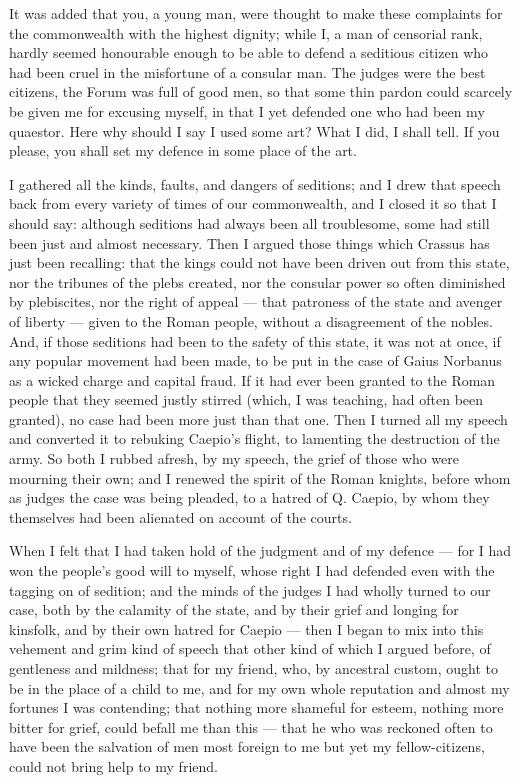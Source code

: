  It was added that you, a young man, were thought to make these complaints for the commonwealth with the highest dignity; while I, a man of censorial rank, hardly seemed honourable enough to be able to defend a seditious citizen who had been cruel in the misfortune of a consular man. The judges were the best citizens, the Forum was full of good men, so that some thin pardon could scarcely be given me for excusing myself, in that I yet defended one who had been my quaestor. Here why should I say I used some art? What I did, I shall tell. If you please, you shall set my defence in some place of the art.

 I gathered all the kinds, faults, and dangers of seditions; and I drew that speech back from every variety of times of our commonwealth, and I closed it so that I should say: although seditions had always been all troublesome, some had still been just and almost necessary. Then I argued those things which Crassus has just been recalling: that the kings could not have been driven out from this state, nor the tribunes of the plebs created, nor the consular power so often diminished by plebiscites, nor the right of appeal — that patroness of the state and avenger of liberty — given to the Roman people, without a disagreement of the nobles. And, if those seditions had been to the safety of this state, it was not at once, if any popular movement had been made, to be put in the case of Gaius Norbanus as a wicked charge and capital fraud. If it had ever been granted to the Roman people that they seemed justly stirred (which, I was teaching, had often been granted), no case had been more just than that one. Then I turned all my speech and converted it to rebuking Caepio's flight, to lamenting the destruction of the army. So both I rubbed afresh, by my speech, the grief of those who were mourning their own; and I renewed the spirit of the Roman knights, before whom as judges the case was being pleaded, to a hatred of Q. Caepio, by whom they themselves had been alienated on account of the courts.

 When I felt that I had taken hold of the judgment and of my defence — for I had won the people's good will to myself, whose right I had defended even with the tagging on of sedition; and the minds of the judges I had wholly turned to our case, both by the calamity of the state, and by their grief and longing for kinsfolk, and by their own hatred for Caepio — then I began to mix into this vehement and grim kind of speech that other kind of which I argued before, of gentleness and mildness; that for my friend, who, by ancestral custom, ought to be in the place of a child to me, and for my own whole reputation and almost my fortunes I was contending; that nothing more shameful for esteem, nothing more bitter for grief, could befall me than this — that he who was reckoned often to have been the salvation of men most foreign to me but yet my fellow-citizens, could not bring help to my friend.

